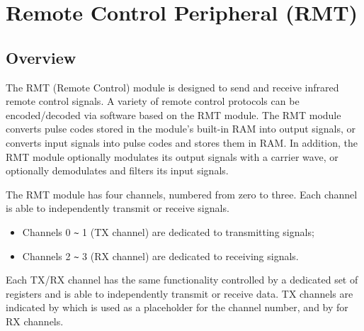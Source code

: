 \documentclass[main\_\_EN.tex]{subfiles}
\begin{document}

\ifglobal
\else
    {\let\clearpage\relax \listoftodos}
    {\let\clearpage\relax \listofdonetodos}
    \tableofcontents
\fi



\hypertarget{rmt}{}
\chapter{Remote Control Peripheral (RMT)}
\label{mod:rmt}


\section{Overview}
The RMT (Remote Control) module is designed to send and receive infrared remote control signals. A variety of remote control protocols can be encoded/decoded via software based on the RMT module. The RMT module converts pulse codes stored in the module's built-in RAM into output signals, or converts input signals into pulse codes and stores them in RAM. In addition, the RMT module optionally modulates its output signals with a carrier wave, or optionally demodulates and filters its input signals.

The RMT module has four channels, numbered from zero to three. Each channel is able to independently transmit or receive signals.
\begin{itemize}
    \item Channels 0 \verb+~+ 1 (TX channel) are dedicated to transmitting signals;
    \item Channels 2 \verb+~+ 3 (RX channel) are dedicated to receiving signals.
\end{itemize}

Each TX/RX channel has the same functionality controlled by a dedicated set of registers and is able to independently transmit or receive data. TX channels are indicated by  which is used as a placeholder for the channel number, and by  for RX channels.
\end{document}
